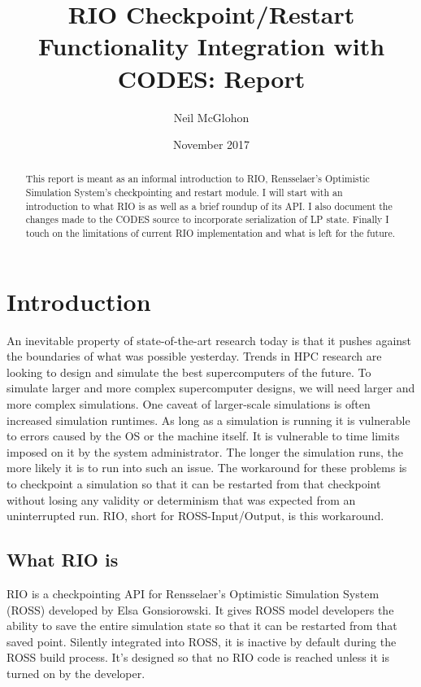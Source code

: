 \documentclass[letterpaper, 11 pt, conference]{IEEEtran}
\title{RIO Checkpoint/Restart Functionality Integration with CODES: Report}
\author{Neil McGlohon}
\date{November 2017}
\begin{document}
\maketitle

\begin{abstract}
	This report is meant as an informal introduction to RIO, Rensselaer's Optimistic Simulation System's checkpointing and restart module. I will start with an introduction to what RIO is as well as a brief roundup of its API. I also document the changes made to the CODES source to incorporate serialization of LP state. Finally I touch on the limitations of current RIO implementation and what is left for the future.
\end{abstract}

\section{Introduction}
An inevitable property of state-of-the-art research today is that it pushes against the boundaries of what was possible yesterday. Trends in HPC research are looking to design and simulate the best supercomputers of the future. To simulate larger and more complex supercomputer designs, we will need larger and more complex simulations. One caveat of larger-scale simulations is often increased simulation runtimes. As long as a simulation is running it is vulnerable to errors caused by the OS or the machine itself. It is vulnerable to time limits imposed on it by the system administrator. The longer the simulation runs, the more likely it is to run into such an issue. The workaround for these problems is to checkpoint a simulation so that it can be restarted from that checkpoint without losing any validity or determinism that was expected from an uninterrupted run. RIO, short for ROSS-Input/Output, is this workaround.


\subsection{What RIO is}
RIO is a checkpointing API for Rensselaer's Optimistic Simulation System (ROSS) developed by Elsa Gonsiorowski. It gives ROSS model developers the ability to save the entire simulation state so that it can be restarted from that saved point. Silently integrated into ROSS, it is inactive by default during the ROSS build process. It's designed so that no RIO code is reached unless it is turned on by the developer. 
\end{document}
